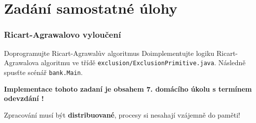 \documentclass[usenames,dvipsnames,9pt]{beamer}
\begin{document}
%
%
%
%


\section{Zadání samostatné úlohy}

{
\begin{frame}
  \frametitle{Ricart-Agrawalovo vyloučení}

\begin{block}{Doprogramujte Ricart-Agrawalův algoritmus}
    Doimplementujte logiku Ricart-Agrawalova algoritmu ve třídě \texttt{exclusion/ExclusionPrimitive.java}. Následně spusťte scénář \texttt{bank.Main}.
  \end{block}

  \vspace{1em}

  \faWarning \hspace{3mm} {\bf Implementace tohoto zadaní je obsahem 7. domácího úkolu s termínem odevzdání \hwVIIdeadline!}


\vspace{2em}

  Zpracování musí být {\bf distribuované}, procesy si nesahají vzájemně do paměti!


\vspace{1.5em}


\end{frame}
}


\framefeedback{}
\end{document}
